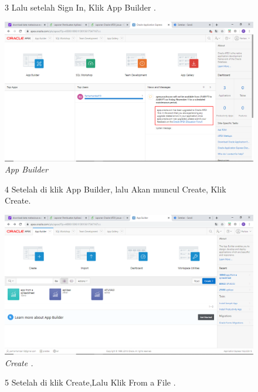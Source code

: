 \begin{enumerate}
\begin{figure}[!htbp]
\item[3] Lalu setelah Sign In, Klik App Builder .

    \begin{center}
\includegraphics[scale=0.2]{figures/2.png}
    \caption{\textit{App Builder}}
        \end{center}
\label{gambar}
\end{figure}

\begin{figure}
\item[4] Setelah di klik App Builder, lalu Akan muncul Create, Klik Create.

    \begin{center}
\includegraphics[scale=0.2]{figures/4.png}
    \caption{\textit{Create .}}
        \end{center}
\label{gambar}
\end{figure}

\begin{figure}
\item[5] Setelah di klik Create,Lalu Klik From a File .


\end{figure}
\end{enumerate}
